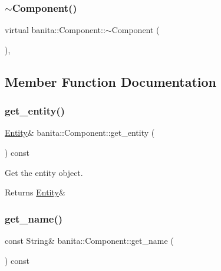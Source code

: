 \mbox{\label{classbanita_1_1_component_a0dc114b2bed0ec1128b20bbf2b5e2eca}} 
\subsubsection{\texorpdfstring{$\sim$Component()}{~Component()}}
{\footnotesize\ttfamily virtual banita\+::\+Component\+::$\sim$\+Component (\begin{DoxyParamCaption}{ }\end{DoxyParamCaption})\hspace{0.3cm}{\ttfamily [inline]}, {\ttfamily [virtual]}}



\subsection{Member Function Documentation}
\mbox{\label{classbanita_1_1_component_a054621244d350d5b8e8543dd3ddd8a61}} 
\subsubsection{\texorpdfstring{get\_entity()}{get\_entity()}}
{\footnotesize\ttfamily \mbox{\hyperlink{classbanita_1_1_entity}{Entity}}\& banita\+::\+Component\+::get\+\_\+entity (\begin{DoxyParamCaption}{ }\end{DoxyParamCaption}) const\hspace{0.3cm}{\ttfamily [inline]}}



Get the entity object. 

\begin{DoxyReturn}{Returns}
\mbox{\hyperlink{classbanita_1_1_entity}{Entity}}\& 
\end{DoxyReturn}
\mbox{\label{classbanita_1_1_component_ae4bb6625c9d7ed340b4e1d41ef85f4ed}} 
\subsubsection{\texorpdfstring{get\_name()}{get\_name()}}
{\footnotesize\ttfamily const String\& banita\+::\+Component\+::get\+\_\+name (\begin{DoxyParamCaption}{ }\end{DoxyParamCaption}) const\hspace{0.3cm}{\ttfamily [inline]}}



